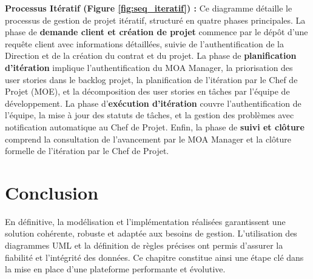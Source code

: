 \textbf{Processus Itératif (Figure \ref{fig:seq_iteratif}) :} Ce diagramme détaille le processus de gestion de projet itératif, structuré en quatre phases principales. La phase de \textbf{demande client et création de projet} commence par le dépôt d'une requête client avec informations détaillées, suivie de l'authentification de la Direction et de la création du contrat et du projet. La phase de \textbf{planification d'itération} implique l'authentification du MOA Manager, la priorisation des user stories dans le backlog projet, la planification de l'itération par le Chef de Projet (MOE), et la décomposition des user stories en tâches par l'équipe de développement. La phase d'\textbf{exécution d'itération} couvre l'authentification de l'équipe, la mise à jour des statuts de tâches, et la gestion des problèmes avec notification automatique au Chef de Projet. Enfin, la phase de \textbf{suivi et clôture} comprend la consultation de l'avancement par le MOA Manager et la clôture formelle de l'itération par le Chef de Projet.



\section{Conclusion}
\label{sec:conclusion_chap3}

En définitive, la modélisation et l’implémentation réalisées garantissent une solution cohérente, robuste et adaptée aux besoins de gestion. L’utilisation des diagrammes UML et la définition de règles précises ont permis d’assurer la fiabilité et l’intégrité des données. Ce chapitre constitue ainsi une étape clé dans la mise en place d’une plateforme performante et évolutive.